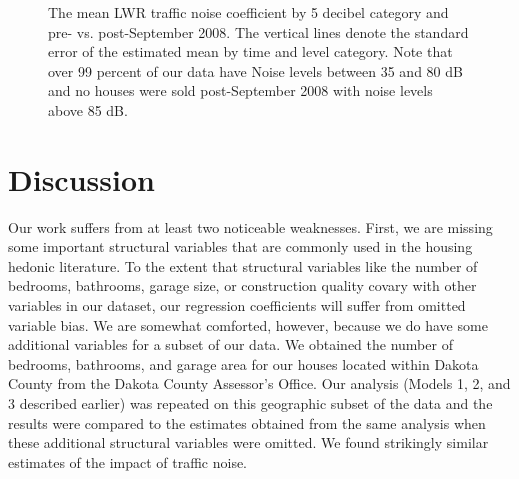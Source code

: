 \documentclass{article}\usepackage{graphicx, color}
\begin{document}
\begin{figure}
\caption{The mean LWR traffic noise coefficient by 5 decibel category and pre- vs. post-September 2008. The vertical lines denote the standard error of the estimated mean by time and level category. Note that over 99 percent of our data have Noise levels between 35 and 80 dB and no houses were sold post-September 2008 with noise levels above 85 dB.}\label{fig:betaMAXvCat}
\end{figure}


\section{Discussion}\label{Discussion}

Our work suffers from at least two noticeable weaknesses. First, we are missing some important structural variables that are commonly used in the housing hedonic literature. To the extent that structural variables like the number of bedrooms, bathrooms, garage size, or construction quality covary with other variables in our dataset, our regression coefficients will suffer from omitted variable bias. We are somewhat comforted, however, because we do have some additional variables for a subset of our data. We obtained the number of bedrooms, bathrooms, and garage area for our houses located within Dakota County from the Dakota County Assessor's Office. Our analysis (Models 1, 2, and 3 described earlier) was repeated on this geographic subset of the data and the results were compared to the estimates obtained from the same analysis when these additional structural variables were omitted. We found strikingly similar estimates of the impact of traffic noise.
\end{document}
